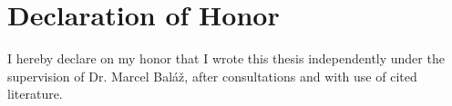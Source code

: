 \thispagestyle{empty}
\vspace*{\fill}
\section*{Declaration of Honor}

I hereby declare on my honor that I wrote this thesis independently under the supervision of Dr. Marcel Baláž, after consultations and with use of cited literature.

\vspace{3\medskipamount}\noindent
\SignPlace \SignDateEN \hspace*{\fill} \signaturespace{5cm}{\Author} 
